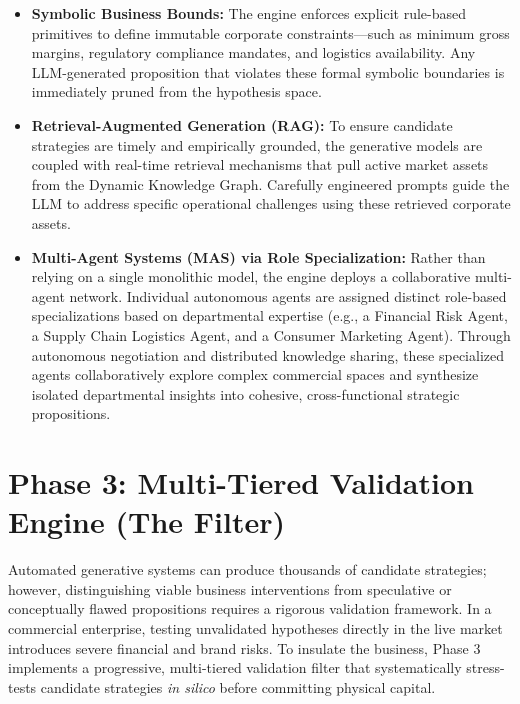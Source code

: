\documentclass[11pt, a4paper]{article}
\begin{document}
\begin{itemize}[leftmargin=*]
    \item \textbf{Symbolic Business Bounds:} The engine enforces explicit rule-based primitives to define immutable corporate constraints---such as minimum gross margins, regulatory compliance mandates, and logistics availability. Any LLM-generated proposition that violates these formal symbolic boundaries is immediately pruned from the hypothesis space.
    
    \item \textbf{Retrieval-Augmented Generation (RAG):} To ensure candidate strategies are timely and empirically grounded, the generative models are coupled with real-time retrieval mechanisms that pull active market assets from the Dynamic Knowledge Graph. Carefully engineered prompts guide the LLM to address specific operational challenges using these retrieved corporate assets.
    
    \item \textbf{Multi-Agent Systems (MAS) via Role Specialization:} Rather than relying on a single monolithic model, the engine deploys a collaborative multi-agent network. Individual autonomous agents are assigned distinct role-based specializations based on departmental expertise (e.g., a Financial Risk Agent, a Supply Chain Logistics Agent, and a Consumer Marketing Agent). Through autonomous negotiation and distributed knowledge sharing, these specialized agents collaboratively explore complex commercial spaces and synthesize isolated departmental insights into cohesive, cross-functional strategic propositions.
\end{itemize}

\section{Phase 3: Multi-Tiered Validation Engine (The Filter)}

Automated generative systems can produce thousands of candidate strategies; however, distinguishing viable business interventions from speculative or conceptually flawed propositions requires a rigorous validation framework. In a commercial enterprise, testing unvalidated hypotheses directly in the live market introduces severe financial and brand risks. To insulate the business, Phase 3 implements a progressive, multi-tiered validation filter that systematically stress-tests candidate strategies \textit{in silico} before committing physical capital.
\end{document}
